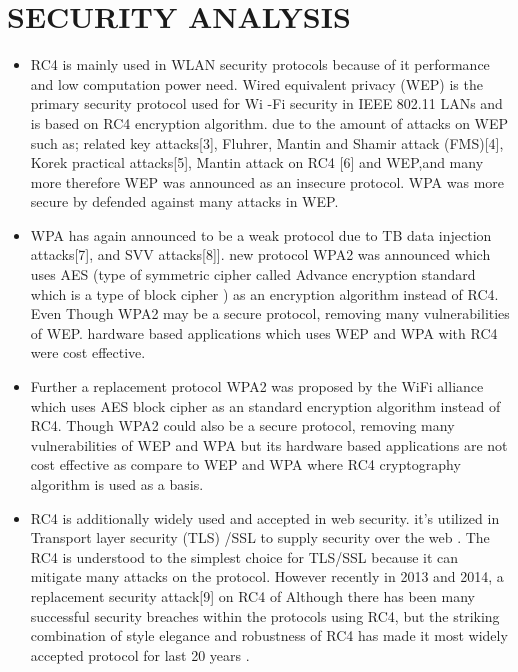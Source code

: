 \documentclass[conference]{IEEEtran}
\begin{document}
\section{SECURITY ANALYSIS}
\begin{itemize}
\item RC4 is mainly used  in WLAN security
protocols because of it performance and low computation power need. Wired equivalent privacy (WEP) is the primary security protocol used for Wi -Fi security in IEEE 802.11 LANs and is based  on RC4 encryption algorithm. due to the amount of attacks on WEP such as;
related key attacks[3], Fluhrer, Mantin and Shamir attack (FMS)[4], Korek practical attacks[5], Mantin attack on RC4 [6] and WEP,and many more therefore WEP was announced  as an insecure protocol.
WPA was more secure by defended against many attacks in WEP.

\item WPA has again announced to be a weak protocol due to TB data injection attacks[7], and SVV attacks[8]]. new
protocol WPA2 was announced which uses AES (type of symmetric cipher called Advance encryption standard which is a type of block cipher ) as an encryption algorithm
instead of RC4. Even Though WPA2 may be a secure protocol, removing many vulnerabilities of WEP.
hardware based applications which uses WEP and WPA with RC4 were cost effective.
\item Further a replacement protocol WPA2 was proposed by the WiFi alliance which uses AES block cipher as an standard encryption algorithm instead of RC4.
Though WPA2 could also be a secure protocol, removing many vulnerabilities of WEP and WPA but its hardware based applications are not  cost effective as compare to WEP and WPA where RC4 cryptography algorithm is used as a basis.

\item RC4 is additionally widely used and accepted in web security. it's utilized in Transport layer security (TLS) /SSL to supply security over the web . The RC4 is understood to the simplest choice for TLS/SSL because it can 
mitigate many attacks on the protocol. However recently in 2013 and 2014, a replacement security attack[9] on RC4 of
Although there has been many successful security breaches within the protocols using RC4, but the striking 
combination of style elegance and robustness of RC4 has made it most widely accepted protocol for last 20 years .  \newline \newline \newline\newline 
\end{itemize}
\end{document}
